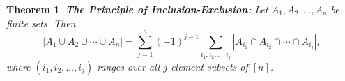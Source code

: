 \documentclass{article} %
\theoremstyle{definition}
\theoremstyle{plain}
\newtheorem{thm}{Theorem}[section]
\begin{document}
\begin{thm} \textbf{The Principle of Inclusion-Exclusion:} Let $A_1,A_2,\ldots,A_n$ be finite sets. Then 
$$|A_1\cup A_2 \cup \cdots \cup A_n|=\sum_{j=1}^n(-1)^{j-1}\sum_{i_1,i_2,\ldots,i_j}|A_{i_1}\cap A_{i_2}\cap \cdots \cap A_{i_j}|,$$
where $(i_1, i_2,\ldots,i_j)$ ranges over all $j$-element subsets of $[n]$.
\end{thm}
\end{document}

